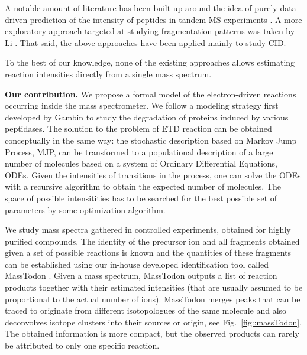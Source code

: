\documentclass{llncs}
\begin{document}
A notable amount of literature has been built up around the idea of purely data-driven prediction of the intensity of peptides in tandem MS experiments \cite{Elias2004-fr,Arnold2006-wn,Degroeve2013-ej}. A more exploratory approach targeted at studying fragmentation patterns was taken by Li \cite{Li2011-mq}. That said, the above approaches have been applied mainly to study CID.

To the best of our knowledge, none of the existing approaches allows estimating reaction intensities directly from a single mass spectrum.

\textbf{Our contribution.}
We propose a formal model of the electron-driven reactions occurring inside the mass spectrometer. We follow a modeling strategy first developed by Gambin \cite{Gambin2010} to study the degradation of proteins induced by various peptidases.
The solution to the problem of ETD reaction can be obtained conceptually in the same way: the stochastic description based on Markov Jump Process, MJP, can be transformed to a populational description of a large number of molecules based on a system of Ordinary Differential Equations, ODEs.
Given the intensities of transitions in the process, one can solve the ODEs with a recursive algorithm to obtain the expected number of molecules.
The space of possible intensitities has to be searched for the best possible set of parameters by some optimization algorithm.

We study mass spectra gathered in controlled experiments, obtained for highly purified compounds. The identity of the precursor ion and all fragments obtained given a set of possible reactions is known and the quantities of these fragments can be established using our in-house developed identification tool called {\sc MassTodon} \cite{Lermyte2015-lm,Lermyte2017-zt}. Given a mass spectrum, {\sc MassTodon} outputs a list of reaction products together with their estimated intensities (that are usually assumed to be proportional to the actual number of ions). {\sc MassTodon} merges peaks that can be traced to originate from different isotopologues of the same molecule and also deconvolves isotope clusters into their sources or origin, see Fig.~\ref{fig::massTodon}.
The obtained information is more compact, but the observed products can rarely be attributed to only one specific reaction.
\end{document}
